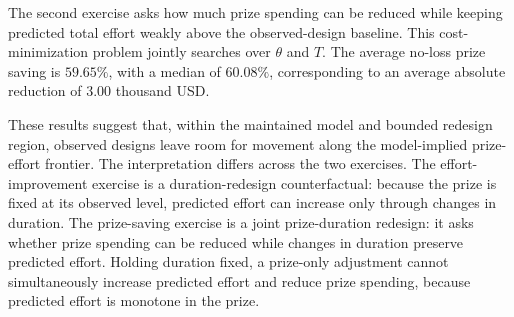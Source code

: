 \documentclass[mnsc]{informs3}
\begin{document}
The second exercise asks how much prize spending can be reduced while keeping
predicted total effort weakly above the observed-design baseline. This
cost-minimization problem jointly searches over $\theta$ and $T$. The average
no-loss prize saving is $59.65\%$, with a median of $60.08\%$, corresponding to
an average absolute reduction of $3.00$ thousand USD.

These results suggest that, within the maintained model and bounded redesign region, observed designs leave room for movement along the model-implied prize-effort frontier.
The interpretation differs across the two exercises.
The effort-improvement exercise is a duration-redesign counterfactual: because the prize is fixed at its observed level, predicted effort can increase only through changes in duration.
The prize-saving exercise is a joint prize-duration redesign: it asks whether prize spending can be reduced while changes in duration preserve predicted effort.
Holding duration fixed, a prize-only adjustment cannot simultaneously increase predicted effort and reduce prize spending, because predicted effort is monotone in the prize.
\end{document}
